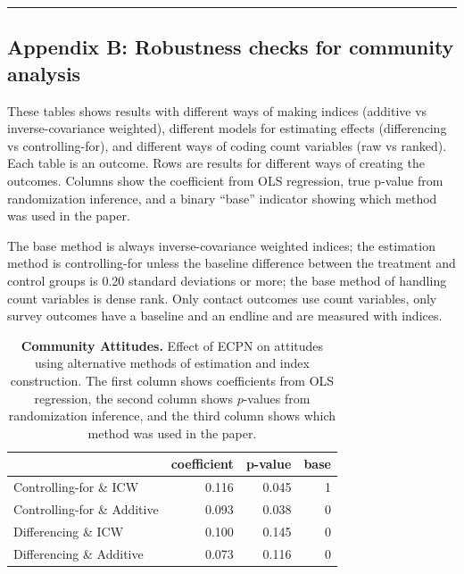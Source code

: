 \documentclass[
]{article}
\begin{document}
\begin{center}\rule{0.5\linewidth}{0.5pt}\end{center}

\hypertarget{appendix-b-robustness-checks-for-community-analysis}{%
\subsection{Appendix B: Robustness checks for community
analysis}\label{appendix-b-robustness-checks-for-community-analysis}}

These tables shows results with different ways of making indices
(additive vs inverse-covariance weighted), different models for
estimating effects (differencing vs controlling-for), and different ways
of coding count variables (raw vs ranked). Each table is an outcome.
Rows are results for different ways of creating the outcomes. Columns
show the coefficient from OLS regression, true p-value from
randomization inference, and a binary ``base'' indicator showing which
method was used in the paper.

The base method is always inverse-covariance weighted indices; the
estimation method is controlling-for unless the baseline difference
between the treatment and control groups is 0.20 standard deviations or
more; the base method of handling count variables is dense rank. Only
contact outcomes use count variables, only survey outcomes have a
baseline and an endline and are measured with indices.

\begin{table}[H]
\begin{center}
\label{tab:attitude_tab}
\caption{\textbf{Community Attitudes.} Effect of ECPN on attitudes using alternative methods of estimation and index construction. The first column shows coefficients from OLS regression, the second column shows $p$-values from randomization inference, and the third column shows which method was used in the paper.}
\smallskip

\begin{tabular}{l|r|r|r}
\hline
  & coefficient & p-value & base\\
\hline
Controlling-for \& ICW & 0.116 & 0.045 & 1\\
\hline
Controlling-for \& Additive & 0.093 & 0.038 & 0\\
\hline
Differencing \& ICW & 0.100 & 0.145 & 0\\
\hline
Differencing \& Additive & 0.073 & 0.116 & 0\\
\hline
\end{tabular}


\end{center}
\end{table}
\end{document}
